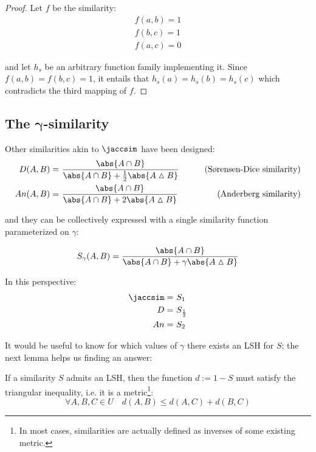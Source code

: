 \begin{proof}
    Let $f$ be the similarity:
    \begin{align*}
        f(a, b) = 1 \\
        f(b, c) = 1 \\
        f(a, c) = 0
    \end{align*}

    and let $h_s$ be an arbitrary function family implementing it. Since $f(a, b) = f(b, c) = 1$, it entails that $h_s(a) = h_s(b) = h_s(c)$ which contradicts the third mapping of $f$.
\end{proof}


\subsection[\texorpdfstring{The $\gamma$-similarity}{The gamma-similarity}]{The $\bm\gamma$-similarity}

Other similarities akin to $\jaccsim$ have been designed:
\begin{align*}
    D(A, B)  =&\ \frac{\abs{A \cap B}}{\abs{A \cap B} + \frac{1}{2} \abs{A \vartriangle B}} & \tag{S\o{}rensen-Dice similarity} \\
    An(A, B) =&\ \frac{\abs{A \cap B}}{\abs{A \cap B} + 2 \abs{A \vartriangle B}}           & \tag{Anderberg similarity}
\end{align*}

and they can be collectively expressed with a single similarity function parameterized on $\gamma$:

\begin{definition}
    \begin{equation}
    \displaystyle S_\gamma(A, B) = \frac{\abs{A \cap B}}{\abs{A \cap B} + \gamma \abs{A \vartriangle B}}
    \end{equation}
\end{definition}

In this perspective:
\begin{align*}
    \jaccsim =&\ S_1 \\
    D        =&\ S_\frac{1}{2} \\
    An       =&\ S_2
\end{align*}

It would be useful to know for which values of $\gamma$ there exists an LSH for $S$; the next lemma helps us finding an answer:

\begin{lemma}[Charikar] \label{lem:charikar}
    If a similarity $S$ admits an LSH, then the function $d := 1 - S$ must satisfy the triangular inequality, i.e. it is a metric\footnote{In most cases, similarities are actually defined as inverses of some existing metric.}:
    \[
        \forall A, B, C \in U \quad d(A, B) \leq d(A, C) + d(B, C)
    \]
\end{lemma}

